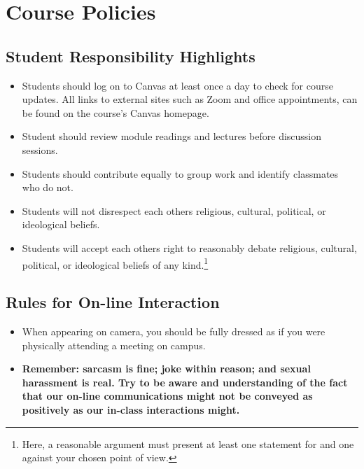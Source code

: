 \documentclass[10pt,]{article}
\providecommand{\tightlist}{%
  \setlength{\itemsep}{0pt}\setlength{\parskip}{0pt}}
\begin{document}
\hypertarget{course-policies}{%
\section{Course Policies}\label{course-policies}}

\hypertarget{student-responsibility-highlights}{%
\subsection{Student Responsibility
Highlights}\label{student-responsibility-highlights}}

\begin{itemize}
\tightlist
\item
  Students should log on to Canvas at least once a day to check for
  course updates. All links to external sites such as Zoom and office
  appointments, can be found on the course's Canvas homepage.
\item
  Student should review module readings and lectures before discussion
  sessions.
\item
  Students should contribute equally to group work and identify
  classmates who do not.
\item
  Students will not disrespect each others religious, cultural,
  political, or ideological beliefs.
\item
  Students will accept each others right to reasonably debate religious,
  cultural, political, or ideological beliefs of any kind.\footnote{Here,
    a reasonable argument must present at least one statement for and
    one against your chosen point of view.}
\end{itemize}

\hypertarget{rules-for-on-line-interaction}{%
\subsection{Rules for On-line
Interaction}\label{rules-for-on-line-interaction}}

\begin{itemize}
\tightlist
\item
  When appearing on camera, you should be fully dressed as if you were
  physically attending a meeting on campus.
\item
  \textbf{Remember: sarcasm is fine; joke within reason; and sexual
  harassment is real. Try to be aware and understanding of the fact that
  our on-line communications might not be conveyed as positively as our
  in-class interactions might.}
\end{itemize}
\end{document}
